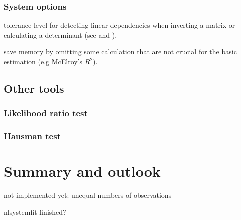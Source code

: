 \documentclass[article]{jss}
\begin{document}
\subsubsection{System options}   
 tolerance level for detecting linear dependencies
   when inverting a matrix or calculating a determinant (see
    and ).

 save memory by omitting some calculation that
   are not crucial for the basic estimation (e.g McElroy's
   $R^2$).


\subsection{Other tools}
  
\subsubsection{Likelihood ratio test}

\subsubsection{Hausman test}


\section{Summary and outlook}\label{sec:Summmary}

not implemented yet: unequal numbers of observations

nlsystemfit finished?

%
\end{document}
